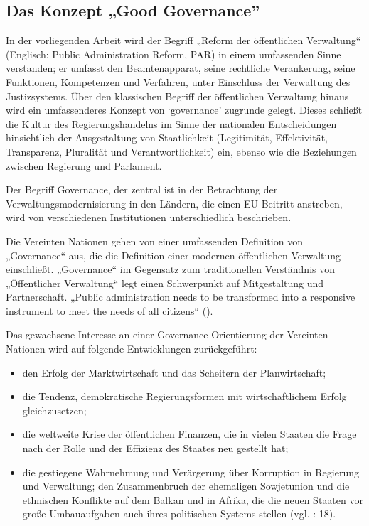 \subsection{Das Konzept „Good Governance”}
In der vorliegenden Arbeit wird der Begriff „Reform der öffentlichen Verwaltung“ (Englisch: Public Administration Reform, PAR) in einem umfassenden Sinne verstanden; er umfasst den Beamtenapparat, seine rechtliche Verankerung, seine Funktionen, Kompetenzen und Verfahren, unter Einschluss der Verwaltung des Justizsystems. Über den klassischen Begriff der öffentlichen Verwaltung hinaus wird ein umfassenderes Konzept von ‘governance’ zugrunde gelegt. Dieses schließt die Kultur des Regierungshandelns im Sinne der nationalen Entscheidungen hinsichtlich der Ausgestaltung von Staatlichkeit (Legitimität, Effektivität, Transparenz, Pluralität und Verantwortlichkeit) ein, ebenso wie die Beziehungen zwischen Regierung und Parlament.\par
Der Begriff Governance, der zentral ist in der Betrachtung der Verwaltungsmodernisierung in den Ländern, die einen EU-Beitritt anstreben, wird von verschiedenen Institutionen unterschiedlich beschrieben.\par
Die Vereinten Nationen gehen von einer umfassenden Definition von „Governance“ aus, die die Definition einer modernen öffentlichen Verwaltung einschließt. „Governance“ im Gegensatz zum traditionellen Verständnis von „Öffentlicher Verwaltung“ legt einen Schwerpunkt auf Mitgestaltung und Partnerschaft. „Public administration needs to be transformed into a responsive instrument to meet the needs of all citizens“ (\cite{unpan}).\par
Das gewachsene Interesse an einer Governance-Orientierung der Vereinten Nationen wird auf folgende Entwicklungen zurückgeführt:
\begin{itemize}
\item den Erfolg der Marktwirtschaft und das Scheitern der Planwirtschaft;
\item die Tendenz, demokratische Regierungsformen mit wirtschaftlichem Erfolg gleichzusetzen;
\item die weltweite Krise der öffentlichen Finanzen, die in vielen Staaten die Frage nach der Rolle und der Effizienz des Staates neu gestellt hat; 
\item die gestiegene Wahrnehmung und Verärgerung über Korruption in Regierung und Verwaltung;
den Zusammenbruch der ehemaligen Sowjetunion und die ethnischen Konflikte auf dem Balkan und in Afrika, die die neuen Staaten vor große Umbauaufgaben auch ihres politischen Systems stellen (vgl. \cite{undp}: 18).
\end{itemize}
